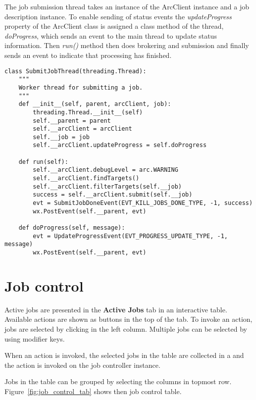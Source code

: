 \documentclass{book}
\newcommand{\python}[1]{\textbf{\sffamily{#1 }}}
\begin{document}
The job submission thread takes an instance of the ArcClient instance and a job description instance. To enable sending of status events the \textit{updateProgress} property of the ArcClient class is assigned a class method of the thread, \textit{doProgress}, which sends an event to the main thread to update status information. Then \textit{run()} method then does brokering and submission and finally sends an event to indicate that processing has finished. 

\begin{shaded}
\begin{verbatim}
class SubmitJobThread(threading.Thread):
    """
    Worker thread for submitting a job.
    """
    def __init__(self, parent, arcClient, job):
        threading.Thread.__init__(self)
        self.__parent = parent
        self.__arcClient = arcClient
        self.__job = job
        self.__arcClient.updateProgress = self.doProgress
        
    def run(self):
        self.__arcClient.debugLevel = arc.WARNING
        self.__arcClient.findTargets()
        self.__arcClient.filterTargets(self.__job)   
        success = self.__arcClient.submit(self.__job)
        evt = SubmitJobDoneEvent(EVT_KILL_JOBS_DONE_TYPE, -1, success)
        wx.PostEvent(self.__parent, evt)
        
    def doProgress(self, message):
        evt = UpdateProgressEvent(EVT_PROGRESS_UPDATE_TYPE, -1, message)
        wx.PostEvent(self.__parent, evt)
\end{verbatim}
\end{shaded}

\section{Job control}

Active jobs are presented in the \textbf{Active Jobs} tab in an interactive table. Available actions are shown as buttons in the top of the tab. To invoke an action, jobs are selected by clicking in the left column. Multiple jobs can be selected by using modifier keys.

When an action is invoked, the selected jobs in the table are collected in a \python{JobController} and the action is invoked on the job controller instance.

Jobs in the table can be grouped by selecting the columns in topmost row. Figure~\ref{fig:job_control_tab} shows then job control table.
\end{document}

